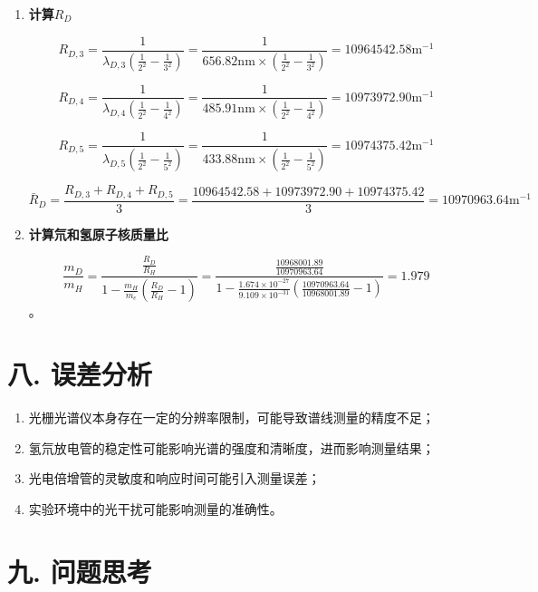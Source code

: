 \documentclass[12pt,a4paper]{article}
\begin{document}
\begin{enumerate}
	$$R_{H,5}=\frac{1}{\lambda_{H,5}(\frac{1}{2^2}-\frac{1}{5^2})}=
	\frac{1}{ 434.00 \mathrm{nm}\times (\frac{1}{2^2}-\frac{1}{ 5 ^2})}= 10971351.28 \mathrm{m}^{-1}$$

	$$\bar R_H=\frac{R_{H,3}+R_{H,4}+R_{H,5}}{3}=
	\frac{10961381.48 +10971272.89 +10971351.28 }{3}=10968001.89 \mathrm{m}^{-1}$$

	\item \textbf{计算$R_D$}

	$$R_{D,3}=\frac{1}{\lambda_{D,3}(\frac{1}{2^2}-\frac{1}{3^2})}=
	\frac{1}{ 656.82 \mathrm{nm}\times (\frac{1}{2^2}-\frac{1}{ 3 ^2})}= 10964542.58 \mathrm{m}^{-1}$$

	$$R_{D,4}=\frac{1}{\lambda_{D,4}(\frac{1}{2^2}-\frac{1}{4^2})}=
	\frac{1}{ 485.91 \mathrm{nm}\times (\frac{1}{2^2}-\frac{1}{ 4 ^2})}=10973972.90 \mathrm{m}^{-1}$$

	$$R_{D,5}=\frac{1}{\lambda_{D,5}(\frac{1}{2^2}-\frac{1}{5^2})}=
	\frac{1}{ 433.88 \mathrm{nm}\times (\frac{1}{2^2}-\frac{1}{ 5 ^2})}= 10974375.42 \mathrm{m}^{-1}$$

	$$\bar R_D=\frac{R_{D,3}+R_{D,4}+R_{D,5}}{3}=
	\frac{10964542.58 +10973972.90 +10974375.42 }{3}=10970963.64 \mathrm{m}^{-1}$$

	\item \textbf{计算氘和氢原子核质量比}

	$$\frac{m_D}{m_H}=\frac{\frac{R_D}{R_H}}{1-\frac{m_H}{m_e}(\frac{R_D}{R_H}-1)}=\frac{\frac{ 10968001.89 }{ 10970963.64 }}{1-\frac{ 1.674\times10^{-27} }{ 9.109\times10^{-31} }(\frac{ 10970963.64 }{ 10968001.89 }-1)}= 1.979$$。

	\end{enumerate}

	
	\section*{\textbf{八. 误差分析}}

	\begin{enumerate}
		\item 光栅光谱仪本身存在一定的分辨率限制，可能导致谱线测量的精度不足；
		\item 氢氘放电管的稳定性可能影响光谱的强度和清晰度，进而影响测量结果；
		\item 光电倍增管的灵敏度和响应时间可能引入测量误差；
		\item 实验环境中的光干扰可能影响测量的准确性。
	\end{enumerate}

	\section*{\textbf{{九. 问题思考}}}
\end{document}
